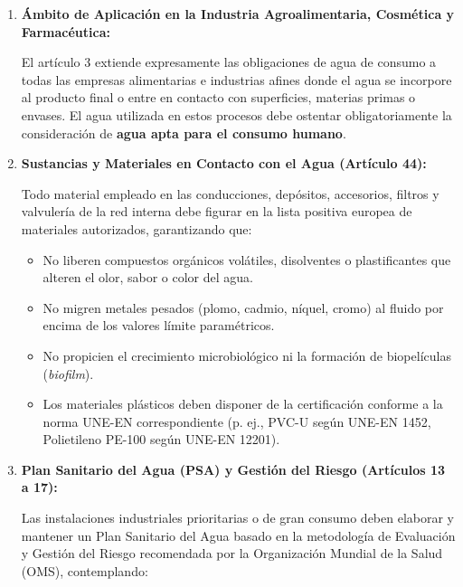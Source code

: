 \documentclass{report}
\begin{document}
\begin{enumerate}

    \item \textbf{Ámbito de Aplicación en la Industria Agroalimentaria, Cosmética y Farmacéutica:}

          El artículo 3 extiende expresamente las obligaciones de agua de consumo a todas las empresas alimentarias e industrias afines donde el agua se incorpore al producto final o entre en contacto con superficies, materias primas o envases. El agua utilizada en estos procesos debe ostentar obligatoriamente la consideración de \textbf{agua apta para el consumo humano}.

    \item \textbf{Sustancias y Materiales en Contacto con el Agua (Artículo 44):}

          Todo material empleado en las conducciones, depósitos, accesorios, filtros y valvulería de la red interna debe figurar en la lista positiva europea de materiales autorizados, garantizando que:

          \begin{itemize}

              \item No liberen compuestos orgánicos volátiles, disolventes o plastificantes que alteren el olor, sabor o color del agua.

              \item No migren metales pesados (plomo, cadmio, níquel, cromo) al fluido por encima de los valores límite paramétricos.

              \item No propicien el crecimiento microbiológico ni la formación de biopelículas (\textit{biofilm}).

              \item Los materiales plásticos deben disponer de la certificación conforme a la norma UNE-EN correspondiente (p. ej., PVC-U según UNE-EN 1452, Polietileno PE-100 según UNE-EN 12201).

          \end{itemize}

    \item \textbf{Plan Sanitario del Agua (PSA) y Gestión del Riesgo (Artículos 13 a 17):}

          Las instalaciones industriales prioritarias o de gran consumo deben elaborar y mantener un Plan Sanitario del Agua basado en la metodología de Evaluación y Gestión del Riesgo recomendada por la Organización Mundial de la Salud (OMS), contemplando:


\end{enumerate}
\end{document}
